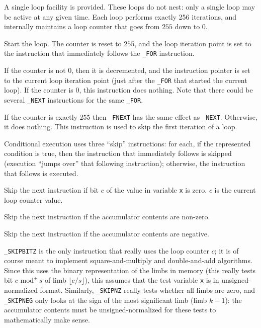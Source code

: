 \documentclass{llncs}
\newcommand{\umod}[2]{#1 \,\,\text{mod}^{+}\, #2}
\begin{document}
A single loop facility is provided. These loops do not nest: only a single
loop may be active at any given time. Each loop performs exactly 256
iterations, and internally maintains a loop counter that goes from $255$
down to $0$.
\begin{codedesc3}

    \item[\_FOR] Start the loop. The counter is reset to $255$, and the
    loop iteration point is set to the instruction that immediately follows
    the \verb+_FOR+ instruction.

    \item[\_NEXT] If the counter is not $0$, then it is decremented, and
    the instruction pointer is set to the current loop iteration point
    (just after the \verb+_FOR+ that started the current loop). If the
    counter is $0$, this instruction does nothing. Note that there could
    be several \verb+_NEXT+ instructions for the same \verb+_FOR+.

    \item[\_FNEXT] If the counter is exactly $255$ then \verb+_FNEXT+ has
    the same effect as \verb+_NEXT+. Otherwise, it does nothing. This
    instruction is used to skip the first iteration of a loop.

\end{codedesc3}

Conditional execution uses three ``skip'' instructions: for each, if the
represented condition is true, then the instruction that immediately
follows is skipped (execution ``jumps over'' that following
instruction); otherwise, the instruction that follows is executed.
\begin{codedesc3}

    \item[\_SKIPBITZ x] Skip the next instruction if bit $c$ of the value
    in variable \verb+x+ is zero. $c$ is the current loop counter value.

    \item[\_SKIPNZ] Skip the next instruction if the accumulator contents
    are non-zero.

    \item[\_SKIPNEG] Skip the next instruction if the accumulator contents
    are negative.

\end{codedesc3}
\verb+_SKIPBITZ+ is the only instruction that really uses the loop
counter $c$; it is of course meant to implement square-and-multiply and
double-and-add algorithms. Since this uses the binary representation
of the limbs in memory (this really tests bit $\umod{c}{s}$ of limb
$\lfloor c/s\rfloor$), this assumes that the test variable \verb+x+ is
in unsigned-normalized format. Similarly, \verb+_SKIPNZ+ really tests
whether all limbs are zero, and \verb+_SKIPNEG+ only looks at the sign
of the most significant limb (limb $k-1$): the accumulator contents
must be unsigned-normalized for these tests to mathematically make sense.
\end{document}
